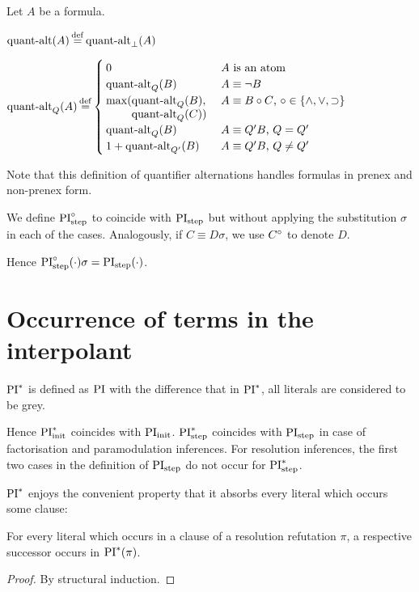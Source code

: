 \documentclass[,%
	draft=false,%
	numbers=noendperiod
	12pt,
	a4paper,
	oneside,%
	openany,
]{memoir}
\begin{document}
\begin{defi}
	Let $A$ be a formula.\nopagebreak
	\medskip

	\noindent
	$\qa(A) \defeq \qa_\bot(A)$
	\nopagebreak
	\medskip

	\noindent
	$
	\qa_Q(A) \defeq 
	\begin{cases}
		0 & \text{$A$ is an atom} \\
		\qa_Q(B) & \text{$A \equiv \lnot B$} \\
		\max(\parbox[t]{0.2\textwidth}{$\qa_Q(B),$\newline$ \qa_Q(C))$} & \text{$A \equiv B \circ C$, $\circ \in \{\land, \lor, \limpl\}$} \\
		\qa_Q(B) & \text{$A \equiv Q' B$, $Q = Q'$} \\
		1+\qa_{Q'}(B) & \text{$A \equiv Q' B$, $Q \neq Q'$}  \\
	\end{cases}
	$
	\nopagebreak

	\qedhere
\end{defi}
Note that this definition of quantifier alternations handles formulas in prenex and non-prenex form.

\begin{defi}
	We define $\operatorname{PI}^{\circ}_{\mathrm{step}}$ to coincide with $\operatorname{PI}_{\mathrm{step}}$ but without applying the substitution $\sigma$ in each of the cases.
	Analogously, if $C \equiv D\sigma$, we use $C^\circ$ to denote $D$.
\end{defi}
Hence $\operatorname{PI}^{\circ}_{\mathrm{step}}(\cdot) \sigma = \operatorname{PI}_{\mathrm{step}}(\cdot)$.


\section{Occurrence of terms in the interpolant}

\begin{defi}[$\PI^*$]
	$\PI^*$ is defined as $\operatorname{PI}$ with the difference that in $\PI^*$, all literals are considered to be grey.
\end{defi}

Hence $\operatorname{PI}_{\mathrm{init}}^*$ coincides with $\operatorname{PI}_{\mathrm{init}}$.
$\operatorname{PI}_{\mathrm{step}}^*$ coincides with $\operatorname{PI}_{\mathrm{step}}$ in case of factorisation and paramodulation inferences.
For resolution inferences, the first two cases in the definition of $\operatorname{PI}_{\mathrm{step}}$ do not occur for $\operatorname{PI}_{\mathrm{step}}^*$.

$\PI^*$ enjoys the convenient property that it absorbs every literal which occurs some clause:

\begin{prop}
	For every literal which occurs in a clause of a resolution refutation $\pi$, a respective successor occurs in $\operatorname{PI}^*(\pi)$.
\end{prop}
\begin{proof}
	By structural induction.
\end{proof}
\end{document}
